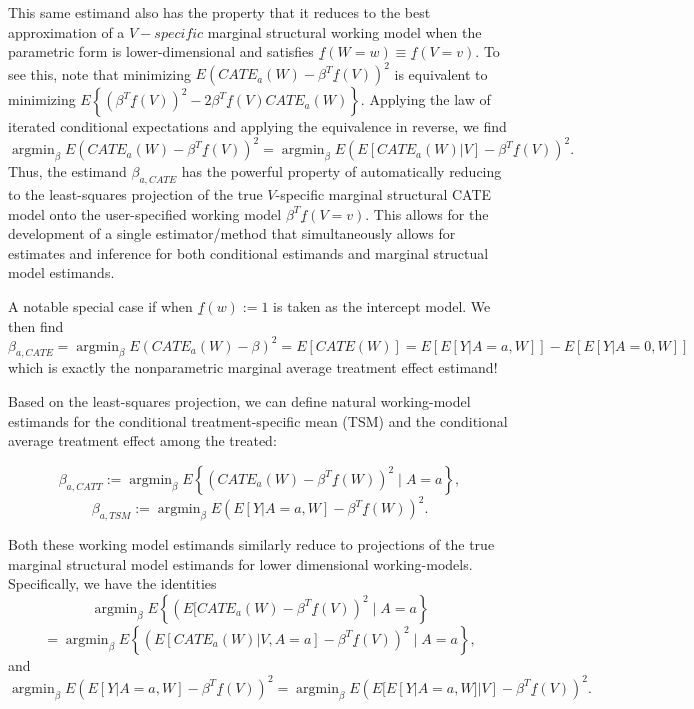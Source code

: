 \documentclass[
]{jss}
\DeclareMathOperator{\argmin}{argmin}
\begin{document}
This same estimand also has the property that it reduces to the best
approximation of a \(V-specific\) marginal structural working model when
the parametric form is lower-dimensional and satisfies
\(\underline{f}(W=w) \equiv \underline{f}(V=v)\). To see this, note that
minimizing \(E\left(CATE_a(W) - \beta^T \underline{f}(V) \right)^2\) is
equivalent to minimizing
\(E\left\{\left( \beta^T \underline{f}(V) \right)^2 - 2 \beta^T \underline{f}(V)CATE_a(W) \right\}\).
Applying the law of iterated conditional expectations and applying the
equivalence in reverse, we find
\[\argmin_{\beta} E\left(CATE_a(W) - \beta^T \underline{f}(V) \right)^2 = \argmin_{\beta} E\left(E[CATE_a(W)|V] - \beta^T \underline{f}(V) \right)^2.\]
Thus, the estimand \(\beta_{a,CATE}\) has the powerful property of
automatically reducing to the least-squares projection of the true
\(V\)-specific marginal structural CATE model onto the user-specified
working model \(\beta^T \underline{f}(V=v)\). This allows for the
development of a single estimator/method that simultaneously allows for
estimates and inference for both conditional estimands and marginal
structual model estimands.

A notable special case if when \(\underline{f}(w) := 1\) is taken as the
intercept model. We then find
\[\beta_{a,CATE} = \argmin_{\beta} E\left(CATE_a(W) - \beta \right)^2 = E[CATE(W)] = E[E[Y|A=a,W]] - E[E[Y|A=0,W]]\]
which is exactly the nonparametric marginal average treatment effect
estimand!

Based on the least-squares projection, we can define natural
working-model estimands for the conditional treatment-specific mean
(TSM) and the conditional average treatment effect among the treated:

\begin{equation}
\beta_{a,CATT} := \argmin_{\beta} E\left\{\left(CATE_a(W) - \beta^T \underline{f}(W) \right)^2 \mid A =a \right\},
\end{equation} \begin{equation}
\beta_{a,TSM} := \argmin_{\beta} E\left(E[Y|A=a,W]- \beta^T \underline{f}(W) \right)^2.
\end{equation}

Both these working model estimands similarly reduce to projections of
the true marginal structural model estimands for lower dimensional
working-models. Specifically, we have the identities
\[  \argmin_{\beta} E\left\{\left(E[CATE_a(W) - \beta^T \underline{f}(V)  \right)^2\mid A =a\right\} \]
\[=  \argmin_{\beta} E\left\{\left(E[CATE_a(W)|V, A=a] - \beta^T \underline{f}(V)  \right)^2\mid A =a\right\},\]
and
\[ \argmin_{\beta} E\left(E[Y|A=a,W]- \beta^T \underline{f}(V) \right)^2 =  \argmin_{\beta} E\left(E[E[Y|A=a,W]|V]- \beta^T \underline{f}(V) \right)^2.\]
\end{document}
